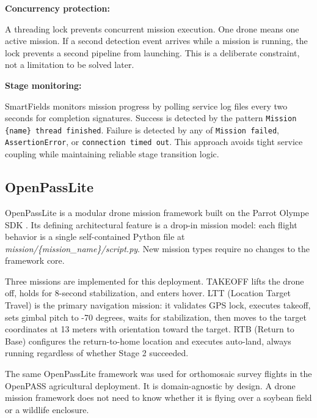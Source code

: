 \textbf{Concurrency protection:}

A threading lock prevents concurrent mission execution. One drone means one active mission. If a second detection event arrives while a mission is running, the lock prevents a second pipeline from launching. This is a deliberate constraint, not a limitation to be solved later.

\textbf{Stage monitoring:}

SmartFields monitors mission progress by polling service log files every two seconds for completion signatures. Success is detected by the pattern \texttt{Mission \{name\} thread finished}. Failure is detected by any of \texttt{Mission failed}, \texttt{AssertionError}, or \texttt{connection timed out}. This approach avoids tight service coupling while maintaining reliable stage transition logic.

\subsection{OpenPassLite}
\label{subsec:ch4_openpasslite_additions}
OpenPassLite is a modular drone mission framework built on the Parrot Olympe SDK \cite{parrot2024olympe}. Its defining architectural feature is a drop-in mission model: each flight behavior is a single self-contained Python file at \textit{mission/\{mission\_name\}/script.py}. New mission types require no changes to the framework core.

Three missions are implemented for this deployment. TAKEOFF lifts the drone off, holds for 8-second stabilization, and enters hover. LTT (Location Target Travel) is the primary navigation mission: it validates GPS lock, executes takeoff, sets gimbal pitch to -70 degrees, waits for stabilization, then moves to the target coordinates at 13 meters with orientation toward the target. RTB (Return to Base) configures the return-to-home location and executes auto-land, always running regardless of whether Stage 2 succeeded.

The same OpenPassLite framework was used for orthomosaic survey flights in the OpenPASS agricultural deployment. It is domain-agnostic by design. A drone mission framework does not need to know whether it is flying over a soybean field or a wildlife enclosure.

